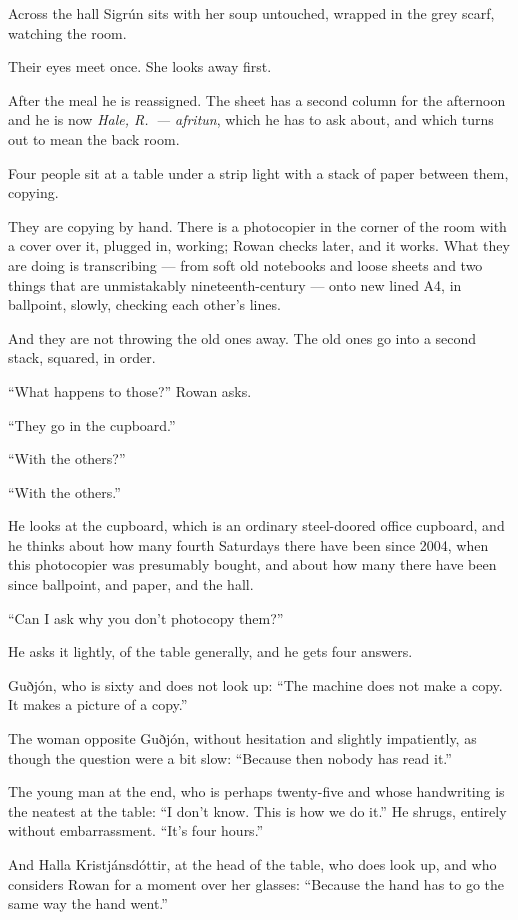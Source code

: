 \documentclass[11pt,oneside]{book}
\newcommand{\sceneline}{%
  \par\vspace{1.2em}
  \begin{center}
    \fontsize{11}{11}\selectfont \textbullet\quad\textbullet\quad\textbullet
  \end{center}
  \vspace{0.6em}\noindent\ignorespaces
}
\begin{document}
Across the hall Sigrún sits with her soup untouched, wrapped in the
grey scarf, watching the room.

Their eyes meet once. She looks away first.

\sceneline

After the meal he is reassigned. The sheet has a second column for the
afternoon and he is now \emph{Hale, R.\ --- afritun}, which he has to
ask about, and which turns out to mean the back room.

Four people sit at a table under a strip light with a stack of paper
between them, copying.

They are copying by hand. There is a photocopier in the corner of the
room with a cover over it, plugged in, working; Rowan checks later, and
it works. What they are doing is transcribing --- from soft old
notebooks and loose sheets and two things that are unmistakably
nineteenth-century --- onto new lined A4, in ballpoint, slowly, checking
each other's lines.

And they are not throwing the old ones away. The old ones go into a
second stack, squared, in order.

``What happens to those?'' Rowan asks.

``They go in the cupboard.''

``With the others?''

``With the others.''

He looks at the cupboard, which is an ordinary steel-doored office
cupboard, and he thinks about how many fourth Saturdays there have been
since 2004, when this photocopier was presumably bought, and about how
many there have been since ballpoint, and paper, and the hall.

``Can I ask why you don't photocopy them?''

He asks it lightly, of the table generally, and he gets four answers.

Guðjón, who is sixty and does not look up: ``The machine does not make a
copy. It makes a picture of a copy.''

The woman opposite Guðjón, without hesitation and slightly impatiently,
as though the question were a bit slow: ``Because then nobody has read
it.''

The young man at the end, who is perhaps twenty-five and whose
handwriting is the neatest at the table: ``I don't know. This is how we
do it.'' He shrugs, entirely without embarrassment. ``It's four hours.''

And Halla Kristjánsdóttir, at the head of the table, who does look up,
and who considers Rowan for a moment over her glasses: ``Because the
hand has to go the same way the hand went.''
\end{document}

